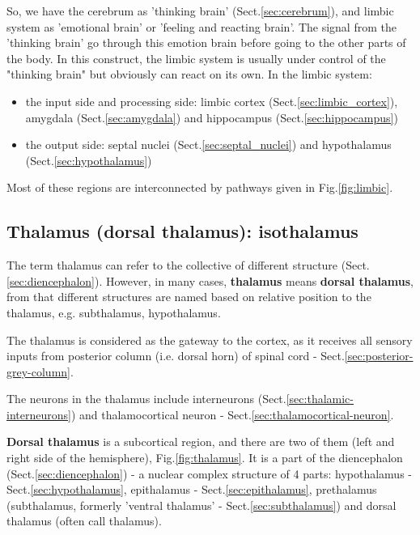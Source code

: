 So, we have the cerebrum as 'thinking brain' (Sect.\ref{sec:cerebrum}), and
limbic system as 'emotional brain' or 'feeling and reacting brain'. The signal
from the 'thinking brain' go through this emotion brain before going to the
other parts of the body.
In this construct, the limbic system is usually under control of the "thinking
brain" but obviously can react on its own. In the limbic system:
\begin{itemize}
  \item the input side and processing side: limbic cortex
  (Sect.\ref{sec:limbic_cortex}), amygdala (Sect.\ref{sec:amygdala}) and
  hippocampus (Sect.\ref{sec:hippocampus})
  
  \item the output side: septal nuclei (Sect.\ref{sec:septal_nuclei}) and
  hypothalamus (Sect.\ref{sec:hypothalamus})
\end{itemize}
Most of these regions are interconnected  by pathways given in
Fig.\ref{fig:limbic}.

\subsection{Thalamus (dorsal thalamus): isothalamus}
\label{sec:thalamus}
\label{sec:dorsal-thalamus}

The term thalamus can refer to the collective of different structure
(Sect.\ref{sec:diencephalon}). However, in many cases, {\bf thalamus} means {\bf
dorsal thalamus}, from that different structures are named based on relative
position to the thalamus, e.g. subthalamus, hypothalamus.

The thalamus is considered as the gateway to the cortex, as it receives all
sensory inputs from posterior column (i.e. dorsal horn) of spinal cord -
Sect.\ref{sec:posterior-grey-column}.

The neurons in the thalamus include interneurons
(Sect.\ref{sec:thalamic-interneurons}) and thalamocortical neuron -
Sect.\ref{sec:thalamocortical-neuron}.

{\bf Dorsal thalamus} is a subcortical region, and there are two of them (left
and right side of the hemisphere), Fig.\ref{fig:thalamus}. It is a part of the
diencephalon (Sect.\ref{sec:diencephalon}) - a nuclear complex structure of 4
parts: hypothalamus - Sect.\ref{sec:hypothalamus}, epithalamus -
Sect.\ref{sec:epithalamus}, prethalamus (subthalamus, formerly 'ventral
thalamus' - Sect.\ref{sec:subthalamus}) and dorsal thalamus (often call
thalamus).


